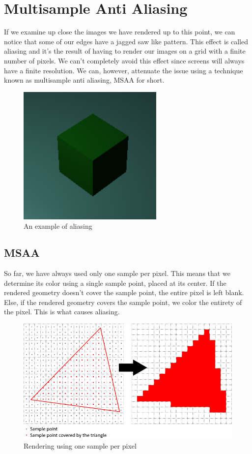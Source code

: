 \chapter{Multisample Anti Aliasing}
\label{chap:MSAA}

If we examine up close the images we have rendered up to this point, we
can notice that some of our edges have a jagged saw like pattern.
This effect is called aliasing and it's the result of having to render our
images on a grid with a finite number of pixels.
We can't completely avoid this effect since screens will always have a
finite resolution.
We can, however, attenuate the issue using a technique known as multisample
anti aliasing, MSAA for short.

\begin{figure}[H]
    \centering
    \includegraphics[scale=1.0]{images/ChMSAA/AnExampleOfAliasing.png}
    \caption{An example of aliasing}
    \label{fig::AliasingExample}
\end{figure}

\section{MSAA}

So far, we have always used only one sample per pixel.
This means that we determine its color using a single sample
point, placed at its center.
If the rendered geometry doesn't cover the sample point, the entire pixel
is left blank.
Else, if the rendered geometry covers the sample point, we color the entirety of
the pixel.
This is what causes aliasing.

\begin{figure}[H]
    \centering
    \includegraphics[scale=0.6]{images/ChMSAA/OneSamplePerPixel.png}
    \caption{Rendering using one sample per pixel}
    \label{fig::OneSamplePerPixel}
\end{figure}

